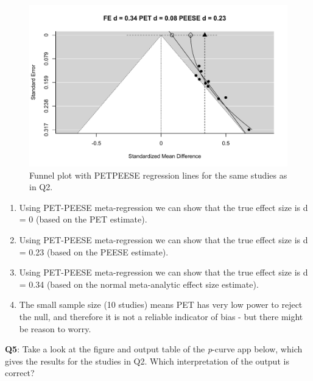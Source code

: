 \documentclass[
  oneside]{krantz}
\providecommand{\tightlist}{%
  \setlength{\itemsep}{0pt}\setlength{\parskip}{0pt}}
\begin{document}
\begin{figure}

{\centering \includegraphics[width=1\linewidth]{12-bias_files/figure-latex/petpeeseq4-1} 

}

\caption{Funnel plot with PETPEESE regression lines for the same studies as in Q2.}\label{fig:petpeeseq4}
\end{figure}

\begin{enumerate}
\def\labelenumi{\Alph{enumi})}
\tightlist
\item
  Using PET-PEESE meta-regression we can show that the true effect size is d = 0 (based on the PET estimate).
\item
  Using PET-PEESE meta-regression we can show that the true effect size is d = 0.23 (based on the PEESE estimate).
\item
  Using PET-PEESE meta-regression we can show that the true effect size is d = 0.34 (based on the normal meta-analytic effect size estimate).
\item
  The small sample size (10 studies) means PET has very low power to reject the null, and therefore it is not a reliable indicator of bias - but there might be reason to worry.
\end{enumerate}

\textbf{Q5}: Take a look at the figure and output table of the \emph{p}-curve app below, which gives the results for the studies in Q2. Which interpretation of the output is correct?
\end{document}
